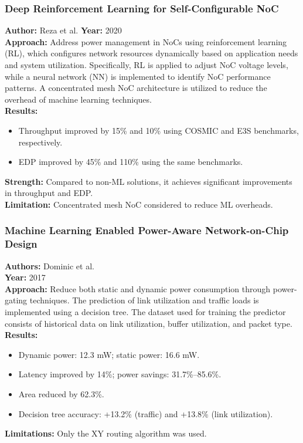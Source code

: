 \documentclass{beamer}
\begin{document}
\begin{frame}
\frametitle{Deep Reinforcement Learning for Self-Configurable NoC}

\textbf{Author:} Reza et al.
\textbf{Year:} 2020 \\[5pt]

\textbf{Approach:} Address power management in NoCs using reinforcement learning (RL), which configures network resources dynamically based on application needs and system utilization. Specifically, RL is applied to adjust NoC voltage levels, while a neural network (NN) is implemented to identify NoC performance patterns. A concentrated mesh NoC architecture is utilized to reduce the overhead of machine learning techniques. \\[5pt]

\textbf{Results:}
\begin{itemize}
\item Throughput improved by 15\% and 10\% using COSMIC and E3S benchmarks, respectively.
\item EDP improved by 45\% and 110\% using the same benchmarks.
\end{itemize}

\textbf{Strength:} Compared to non-ML solutions, it achieves significant improvements in throughput and EDP. \\[5pt]

\textbf{Limitation:} Concentrated mesh NoC considered to reduce ML overheads. \\[5pt]

\end{frame}

\begin{frame}
\frametitle{Machine Learning Enabled Power-Aware Network-on-Chip Design}

\textbf{Authors:} Dominic et al. \\
\textbf{Year:} 2017 \\[10pt]

\textbf{Approach:} Reduce both static and dynamic power consumption through power-gating techniques. The prediction of link utilization and traffic loads is implemented using a decision tree. The dataset used for training the predictor consists of historical data on link utilization, buffer utilization, and packet type. \\[10pt]

\textbf{Results:}
\begin{itemize}
\item Dynamic power: 12.3 mW; static power: 16.6 mW.
\item Latency improved by 14\%; power savings: 31.7\%–85.6\%.
\item Area reduced by 62.3\%.
\item Decision tree accuracy: +13.2\% (traffic) and +13.8\% (link utilization).
\end{itemize}


\textbf{Limitations:} Only the XY routing algorithm was used.
\end{frame}
\end{document}
